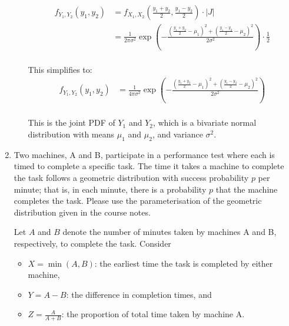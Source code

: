 \documentclass[12pt]{article}
\begin{document}
\begin{enumerate}
\begin{enumerate}
\begin{align*}
f_{Y_1, Y_2}(y_1, y_2) &= f_{X_1, X_2}\left(\frac{y_1 + y_2}{2}, \frac{y_1 - y_2}{2}\right) \cdot \left|J\right| \\
&= \frac{1}{2\pi \sigma^2} \exp\left(-\frac{\left(\frac{y_1 + y_2}{2} - \mu_1\right)^2 + \left(\frac{y_1 - y_2}{2} - \mu_2\right)^2}{2\sigma^2}\right) \cdot \frac{1}{2} \\
\end{align*}

This simplifies to:
\begin{align*}
f_{Y_1, Y_2}(y_1, y_2) &= \frac{1}{4\pi \sigma^2} \exp\left(-\frac{\left(\frac{y_1 + y_2}{2} - \mu_1\right)^2 + \left(\frac{y_1 - y_2}{2} - \mu_2\right)^2}{2\sigma^2}\right) \\
\end{align*}

This is the joint PDF of $Y_1$ and $Y_2$, which is a bivariate normal distribution with means $\mu_1$ and $\mu_2$, and variance $\sigma^2$.
%

\end{enumerate}

\vspace{5pt}
\item 
Two machines, A and B, participate in a performance test where each is timed to complete a specific task. The time it takes a machine to complete the task follows a geometric distribution with success probability $p$ per minute; that is, in each minute, there is a probability $p$ that the machine completes the task. Please use the parameterisation of the geometric distribution given in the course notes.  

Let $A$ and $B$ denote the number of minutes taken by machines A and B, respectively, to complete the task. Consider
\begin{itemize}
\item $X=\min(A, B)$: the earliest time the task is completed by either machine,
\item $Y = A-B$: the difference in completion times, and 
\item $Z = \frac{A}{A+B}$: the proportion of total time taken by machine A.
\end{itemize}
 

\end{enumerate}
\end{document}
